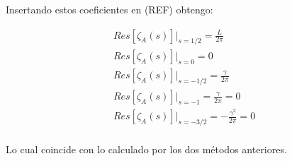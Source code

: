 Insertando estos coeficientes en (REF) obtengo:

\begin{equation}
\begin{array}{c}
Res[ \zeta _A (s)] | _{s=1/2} = \frac{L}{2 \pi} \\
Res[ \zeta _A (s)] | _{s=0} = 0 \\
Res[ \zeta _A (s)] | _{s=-1/2} = \frac{\gamma}{2 \pi} \\
Res[ \zeta _A (s)] | _{s=-1} = \frac{\gamma}{2 \pi} = 0 \\
Res[ \zeta _A (s)] | _{s=-3/2} = - \frac{\gamma ^2}{2 \pi} = 0 \\


\end{array}
\end{equation}

Lo cual coincide con lo calculado por los dos métodos anteriores.
